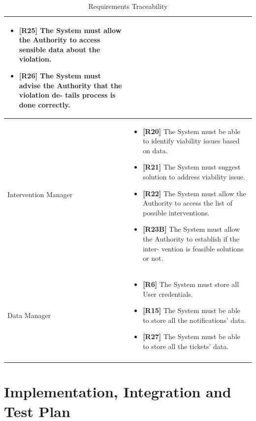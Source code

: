 \documentclass{article}
\begin{document}
\begin{longtable}{| p{5 cm} | p{8 cm} |}
\begin{itemize}
			\item  {{\bf [R25]} The System must allow the Authority to access sensible data
about the violation.}
			\item  {{\bf [R26]} The System must advise the Authority that the violation de- tails process is done correctly.}
		\end{itemize}		\\	 \hline	
			\newline Intervention Manager & 
		\begin{itemize}
			\item  {{\bf [R20]} The System must be able to identify viability issues based on data.}
			\item  {{\bf [R21]} The System must suggest solution to address viability issue.}
			\item  {{\bf [R22]} The System must allow the Authority to access the list of possible interventions.
}
			\item  {{\bf [R23B]} The System must allow the Authority to establish if the inter- vention is feasible solutions or not.}
		\end{itemize}		\\	 \hline	
			\newline Data Manager & 
		\begin{itemize}
			\item {{\bf [R6]} The System must store all User credentials.}

			\item  {{\bf [R15]} The System must be able to store all the notifications’ data.}
			\item   {{\bf [R27]} The System must be able to store all the tickets’ data.}
		\end{itemize}		\\	 \hline			
		\caption{Requirements Traceability}	
		
	\end{longtable}
	
	\pagebreak
	
	
\section{Implementation, Integration and Test Plan}
\end{document}
